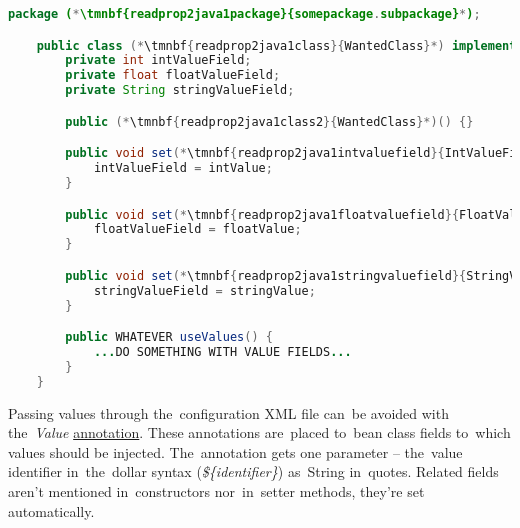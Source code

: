 \begin{lstlisting}[language=Java, title={Wanted class with the zero--parameter constructor and setter methods}]
    package (*\tmnbf{readprop2java1package}{somepackage.subpackage}*);

    public class (*\tmnbf{readprop2java1class}{WantedClass}*) implements WantedInterface {
        private int intValueField;
        private float floatValueField;
        private String stringValueField;

        public (*\tmnbf{readprop2java1class2}{WantedClass}*)() {}

        public void set(*\tmnbf{readprop2java1intvaluefield}{IntValueField}*)(int intValue) {
            intValueField = intValue;
        }

        public void set(*\tmnbf{readprop2java1floatvaluefield}{FloatValueField}*)(float floatValue) {
            floatValueField = floatValue;
        }

        public void set(*\tmnbf{readprop2java1stringvaluefield}{StringValueField}*)(string stringValue) {
            stringValueField = stringValue;
        }

        public WHATEVER useValues() {
            ...DO SOMETHING WITH VALUE FIELDS...
        }
    }
\end{lstlisting}
\newpage

\label{readingpropertiesannotations}
Passing values through the~configuration XML file can~be avoided with the~\textit{Value} \hyperref[javaannotation]{annotation}.
These annotations are~placed to~bean class fields to~which values should be injected.
The~annotation gets one parameter -- the~value identifier in~the~dollar syntax (\textit{\$\{identifier\}}) as~String in~quotes.
Related fields aren't mentioned in~constructors nor~in~setter methods, they're set automatically.

